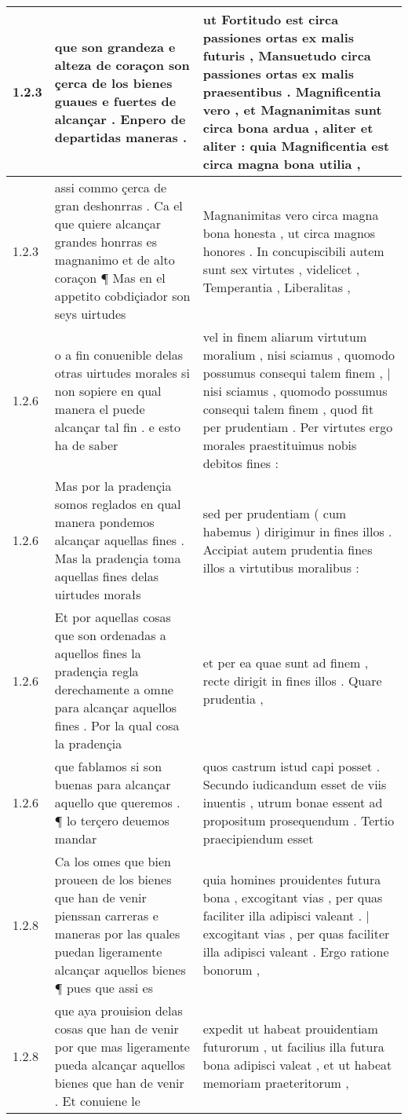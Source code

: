 \begin{tabular}{|p{1cm}|p{6.5cm}|p{6.5cm}|}
1.2.3 & que son grandeza e alteza de coraçon son çerca de los bienes guaues e fuertes de alcançar . Enpero de departidas maneras . & ut Fortitudo est circa passiones ortas ex malis futuris , Mansuetudo circa passiones ortas ex malis praesentibus . Magnificentia vero , et Magnanimitas sunt circa bona ardua , aliter et aliter : quia Magnificentia est circa magna bona utilia , \\\hline
1.2.3 & assi commo çerca de gran deshonrras . Ca el que quiere alcançar grandes honrras es magnanimo et de alto coraçon ¶ Mas en el appetito cobdiçiador son seys uirtudes & Magnanimitas vero circa magna bona honesta , ut circa magnos honores . In concupiscibili autem sunt sex virtutes , videlicet , Temperantia , Liberalitas , \\\hline
1.2.6 & o a fin conuenible delas otras uirtudes morales si non sopiere en qual manera el puede alcançar tal fin . e esto ha de saber & vel in finem aliarum virtutum moralium , nisi sciamus , quomodo possumus consequi talem finem , | nisi sciamus , quomodo possumus consequi talem finem , quod fit per prudentiam . Per virtutes ergo morales praestituimus nobis debitos fines : \\\hline
1.2.6 & Mas por la pradençia somos reglados en qual manera pondemos alcançar aquellas fines . Mas la pradençia toma aquellas fines delas uirtudes morałs & sed per prudentiam ( cum habemus ) dirigimur in fines illos . Accipiat autem prudentia fines illos a virtutibus moralibus : \\\hline
1.2.6 & Et por aquellas cosas que son ordenadas a aquellos fines la pradençia regla derechamente a omne para alcançar aquellos fines . Por la qual cosa la pradençia & et per ea quae sunt ad finem , recte dirigit in fines illos . Quare prudentia , \\\hline
1.2.6 & que fablamos si son buenas para alcançar aquello que queremos . ¶ lo terçero deuemos mandar & quos castrum istud capi posset . Secundo iudicandum esset de viis inuentis , utrum bonae essent ad propositum prosequendum . Tertio praecipiendum esset \\\hline
1.2.8 & Ca los omes que bien proueen de los bienes que han de venir pienssan carreras e maneras por las quales puedan ligeramente alcançar aquellos bienes ¶ pues que assi es & quia homines prouidentes futura bona , excogitant vias , per quas faciliter illa adipisci valeant . | excogitant vias , per quas faciliter illa adipisci valeant . Ergo ratione bonorum , \\\hline
1.2.8 & que aya prouision delas cosas que han de venir por que mas ligeramente pueda alcançar aquellos bienes que han de venir . Et conuiene le & expedit ut habeat prouidentiam futurorum , ut facilius illa futura bona adipisci valeat , et ut habeat memoriam praeteritorum , \\\hline

\end{tabular}

